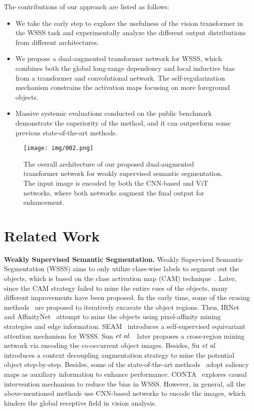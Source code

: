 \documentclass[journal]{IEEEtran}
\begin{document}
The contributions of our approach are listed as follows: 

\begin{itemize}
	\item We take the early step to explore the usefulness of the vision transformer in the WSSS task and experimentally analyze the different output distributions from different architectures.
	\item We propose a dual-augmented transformer network for WSSS, which combines both the global long-range dependency and local inductive bias from a transformer and convolutional network. The self-regularization mechanism constrains the activation maps focusing on more foreground objects.
	\item Massive systemic evaluations conducted on the public benchmark demonstrate the superiority of the method, and it can outperform some previous state-of-the-art methods.
\end{itemize}


\begin{figure*}[t]
		\begin{center}
			\centering
			\texttt{[image: img/002.png]}
		\end{center}
		\caption{The overall architecture of our proposed dual-augmented transformer network for weakly supervised semantic segmentation. The input image is encoded by both the CNN-based and ViT networks, where both networks augment the final output for enhancement.}
		\label{fig2}
\end{figure*}

\section{Related Work}
\label{sec:guidelines}

\textbf{Weakly Supervised Semantic Segmentation.} 
Weakly Supervised Semantic Segmentation (WSSS) aims to only utilize class-wise labels to segment out the objects, which is based on the class activation map (CAM) technique~\cite{zhou2016learning}.
Later, since the CAM strategy failed to mine the entire cues of the objects, many different improvements have been proposed. In the early time, some of the erasing methods~\cite{wei2017object,hou2018self} are proposed to iteratively excavate the object regions. Then, IRNet~\cite{ahn2019weakly} and AffinityNet~\cite{ahn2018learning} attempt to mine the objects using pixel-affinity mining strategies and edge information. SEAM~\cite{wang2020self} introduces a self-supervised equivariant attention mechanism for WSSS. Sun $\emph{et~al.}$~\cite{sun2020mining} later proposes a cross-region mining network via encoding the co-occurrent object images. Besides, Su $\emph{et~al.}$~\cite{su2021context} introduces a context decoupling augmentation strategy to mine the potential object step-by-step. 
Besides, some of the state-of-the-art methods~\cite{lee2019ficklenet,huang2018weakly} adopt saliency maps as auxiliary information to enhance performance. CONTA~\cite{zhang2020causal} explores causal intervention mechanism to reduce the bias in WSSS.
However, in general, all the above-mentioned methods use CNN-based networks to encode the images, which hinders the global receptive field in vision analysis.
\end{document}
